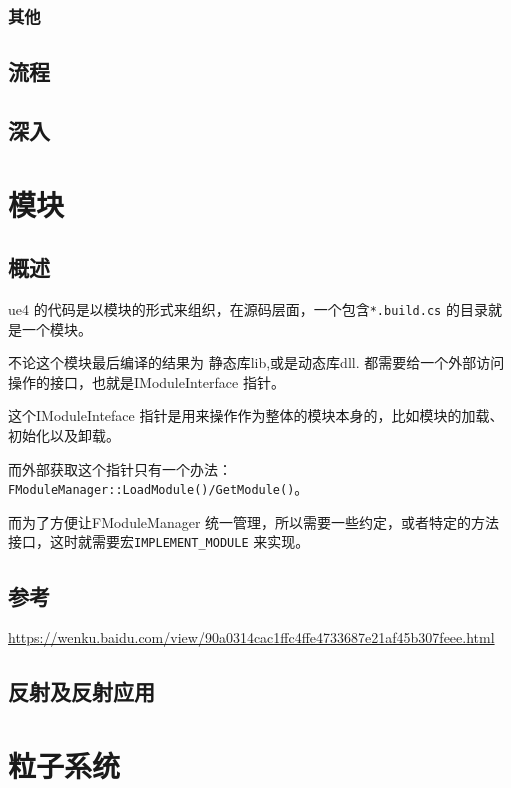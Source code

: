 \documentclass[UTF8,a4paper,12pt]{ctexbook}
\begin{document}
		
		\subsection{其他}
		
		
				
	\section{流程}
	
	
	\section{深入}
	
	




\chapter{模块}
	\section{概述}
		ue4 的代码是以模块的形式来组织，在源码层面，一个包含\verb|*.build.cs| 的目录就是一个模块。
		
		不论这个模块最后编译的结果为 静态库lib,或是动态库dll. 都需要给一个外部访问操作的接口，也就是IModuleInterface 指针。
		
		这个IModuleInteface 指针是用来操作作为整体的模块本身的，比如模块的加载、初始化以及卸载。
		
		而外部获取这个指针只有一个办法：\verb|FModuleManager::LoadModule()/GetModule()|。
		
		而为了方便让FModuleManager 统一管理，所以需要一些约定，或者特定的方法接口，这时就需要宏\verb|IMPLEMENT_MODULE| 来实现。
		
	
	\section{参考}
		\url{https://wenku.baidu.com/view/90a0314cac1ffc4ffe4733687e21af45b307feee.html}


\section{反射及反射应用}

	
\chapter{粒子系统}
							
\end{document}
